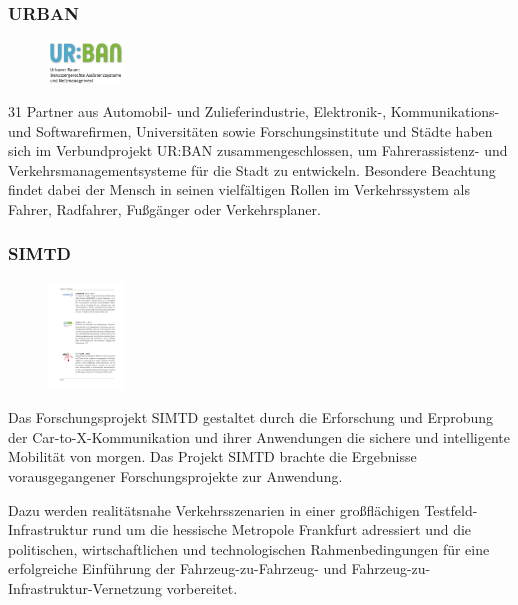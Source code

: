 \subsubsection{\acs{URBAN}}
\begin{figure}
  \centering
  	 \includegraphics[width=0.18\textwidth]{./content/images/logos/logo-projekte/urban_logo.eps}
\end{figure}
31 Partner aus Automobil- und Zulieferindustrie, Elektronik-, Kommunikations- und Softwarefirmen, Universitäten sowie Forschungsinstitute und Städte haben sich im Verbundprojekt UR:BAN zusammengeschlossen, um Fahrerassistenz- und Verkehrsmanagementsysteme für die Stadt zu entwickeln. Besondere Beachtung findet dabei der Mensch in seinen vielfältigen Rollen im Verkehrssystem als Fahrer, Radfahrer, Fußgänger oder Verkehrsplaner. \cite{urban_info}

\subsubsection{\acs{SIMTD}}
\begin{figure}
  \centering
  	 \includegraphics[width=0.18\textwidth]{./content/images/logos/logo-projekte/logo_simtd.pdf}
\end{figure}
Das Forschungsprojekt \ac{SIMTD} gestaltet durch die Erforschung und Erprobung der Car-to-X-Kommunikation und ihrer Anwendungen die sichere und intelligente Mobilität von morgen. 
Das Projekt \ac{SIMTD} brachte die Ergebnisse vorausgegangener Forschungsprojekte zur Anwendung. 

Dazu werden realitätsnahe Verkehrsszenarien in einer großflächigen Testfeld-Infrastruktur rund um die hessische Metropole Frankfurt adressiert und die politischen, wirtschaftlichen und technologischen Rahmenbedingungen für eine erfolgreiche Einführung der Fahrzeug-zu-Fahrzeug- und Fahrzeug-zu-Infrastruktur-Vernetzung vorbereitet. \cite{simtd_info}
